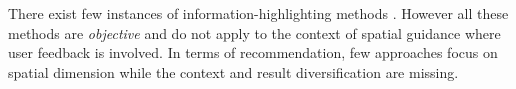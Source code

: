 \documentclass{vldb}
\newcommand{\framework}{{\sc GeoHighlight}}
\begin{document}

There exist few instances of information-highlighting methods \cite{Liang2010,Robinson2011,wongsuphasawat2016voyager,willett2007scented}. However all these methods are {\em objective} and do not apply to the context of spatial guidance where user feedback is involved.  In terms of recommendation, few approaches focus on spatial dimension
\cite{Bao2015,Levandoski:2012}
while the context and result diversification are missing.



\end{document}

